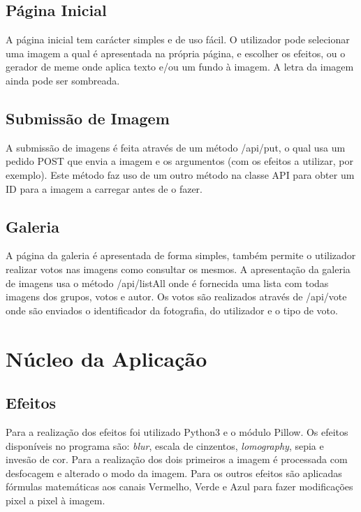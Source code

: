 \documentclass{report}
\begin{document}
\subsection{Página Inicial}

A página inicial tem carácter simples e de uso fácil. O utilizador pode selecionar uma imagem a qual é apresentada na própria página, e escolher os efeitos, ou o gerador de meme onde aplica texto e/ou um fundo à imagem. A letra da imagem ainda pode ser sombreada.

\subsection{Submissão de Imagem}

A submissão de imagens é feita através de um método /api/put, o qual usa um pedido POST que envia a imagem e os argumentos (com os efeitos a utilizar, por exemplo). Este método faz uso de um outro método na classe API para obter um ID para a imagem a carregar antes de o fazer.

\subsection{Galeria}

A página da galeria é apresentada de forma simples, também permite o utilizador realizar votos nas imagens como consultar os mesmos. A apresentação da galeria de imagens usa o método /api/listAll onde é fornecida uma lista com todas imagens dos grupos, votos e autor. Os votos são realizados através de /api/vote onde são enviados o identificador da fotografia, do utilizador e o tipo de voto.

\section{Núcleo da Aplicação}

\subsection{Efeitos}

Para a realização dos efeitos foi utilizado Python3 e o módulo Pillow.
Os efeitos disponíveis no programa são: \textit{blur}, escala de cinzentos, \textit{lomography}, sepia e invesão de cor. Para a realização dos dois primeiros a imagem é processada com desfocagem e alterado o modo da imagem. Para os outros efeitos são aplicadas fórmulas matemáticas aos canais Vermelho, Verde e Azul para fazer modificações pixel a pixel à imagem.
\end{document}
